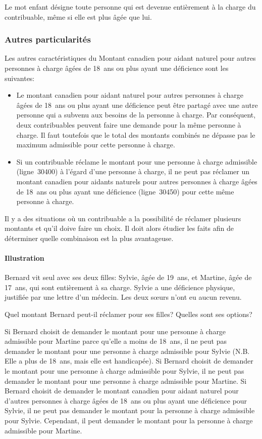 Le mot \og enfant \fg{} désigne toute personne qui est devenue entièrement à la charge du contribuable, même si elle est plus âgée que lui.

\subsubsection{Autres particularités}
Les autres caractéristiques du Montant canadien pour aidant naturel pour autres personnes à charge âgées de 18~ans ou plus ayant une déficience sont les suivantes:
\begin{itemize}
	\item Le montant canadien pour aidant naturel pour autres personnes à charge âgées de 18~ans ou plus ayant une déficience peut être partagé avec une autre personne qui a subvenu aux besoins de la personne à charge. Par conséquent, deux contribuables peuvent faire une demande pour la même personne à charge. Il faut toutefois que le total des montants combinés ne dépasse pas le maximum admissible pour cette personne à charge.
	\item Si un contribuable réclame le \og montant pour une personne à charge admissible \fg{} (ligne~30400) à l'égard d'une personne à charge, il ne peut pas réclamer un montant canadien pour aidants naturels pour autres personnes à charge âgées de 18~ans ou plus ayant une déficience (ligne~30450) pour cette même personne à charge.
\end{itemize}

Il y a des situations où un contribuable a la possibilité de réclamer plusieurs montants et qu'il doive faire un choix. Il doit alors étudier les faits afin de déterminer quelle combinaison est la plus avantageuse.

\paragraph{Illustration}
Bernard vit seul avec ses deux filles: Sylvie, âgée de 19~ans, et Martine, âgée de 17~ans, qui sont entièrement à sa charge. Sylvie a une déficience physique, justifiée par une lettre d'un médecin. Les deux sœurs n'ont eu aucun revenu.

Quel montant Bernard peut-il réclamer pour ses filles? Quelles sont ses options?

Si Bernard choisit de demander le montant pour une personne à charge admissible pour Martine parce qu'elle a moins de 18~ans, il ne peut pas demander le montant pour une personne à charge admissible pour Sylvie (N.B. Elle a plus de 18~ans, mais elle est handicapée).
Si Bernard choisit de demander le montant pour une personne à charge admissible pour Sylvie, il ne peut pas demander le montant pour une personne à charge admissible pour Martine.
Si Bernard choisit de demander le montant canadien pour aidant naturel pour d'autres personnes à charge âgées de 18~ans ou plus ayant une déficience pour Sylvie, il ne peut pas demander le montant pour la personne à charge admissible pour Sylvie. Cependant, il peut demander le montant pour la personne à charge admissible pour Martine.

